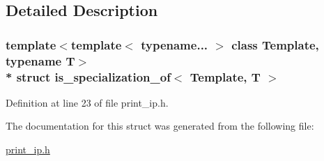 \subsection{Detailed Description}
\subsubsection*{template$<$template$<$ typename... $>$ class Template, typename T$>$\\*
struct is\+\_\+specialization\+\_\+of$<$ Template, T $>$}



Definition at line 23 of file print\+\_\+ip.\+h.



The documentation for this struct was generated from the following file\+:\begin{DoxyCompactItemize}
\item 
\hyperlink{print__ip_8h}{print\+\_\+ip.\+h}\end{DoxyCompactItemize}
